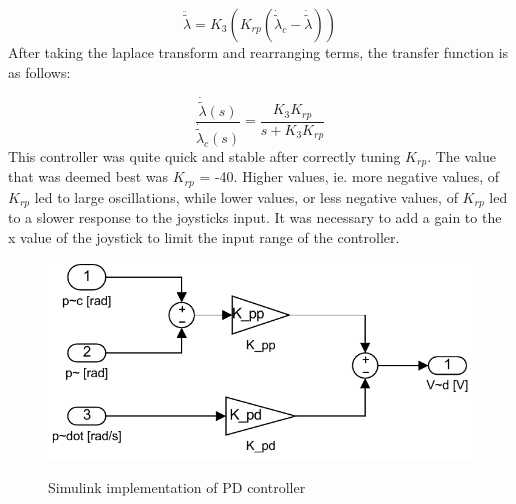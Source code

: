 \begin{equation}
\label{eq:p controller in travel EoM}
\ddot{\tilde{\lambda}} = K_3(K_{rp}(\dot{\tilde{\lambda}}_c -
\dot{\tilde{\lambda}}))
\end{equation}
After taking the laplace transform and rearranging terms, the transfer
function is as follows:

\begin{equation}
\label{eq:Transfer function between travel and desired travel}
\frac{\dot{\tilde{\lambda}}(s)}{\dot{\tilde{\lambda}}_c(s)} =
\frac{K_3K_{rp}}{s + K_3K_{rp}}
\end{equation}
This controller was quite quick and stable after correctly tuning
$K_{rp}$. The value that was deemed best was $K_{rp}$ = -40. Higher
values, ie. more negative values, of $K_{rp}$ led to large
oscillations, while lower values, or less negative values, of $K_{rp}$
led to a slower response to the joysticks input.  It was necessary
to add a gain to the x value of the joystick to limit the input range
of the controller.

\begin{figure}
  \caption{Simulink implementation of PD controller}
  \centering
  \includegraphics{images/pd_pitch_control.pdf}
  \label{fig:Pitch controller}
\end{figure}


